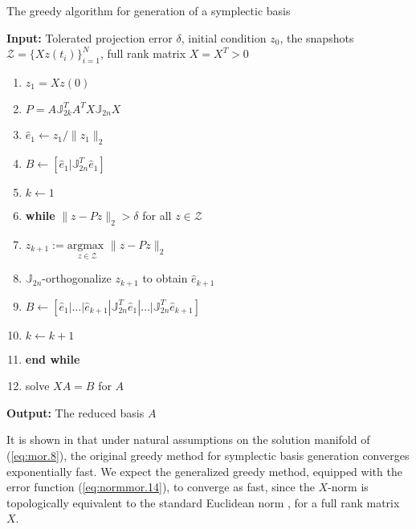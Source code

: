 \begin{algorithm} 
\caption{The greedy algorithm for generation of a symplectic basis} \label{alg:2}
{\bf Input:} Tolerated projection error $\delta$, initial condition $ z_0$, the snapshots $\mathcal Z = \{Xz(t_i)\}_{i=1}^{N}$, full rank matrix $X=X^T>0$
\begin{enumerate}
\item $z_1 = Xz(0)$
\item $P = A \mathbb J_{2k}^T A^T X \mathbb J_{2n} X$
\item $\hat e_1 \leftarrow z_1/ \| z_1 \|_2$
\item $B \leftarrow [\hat e_1| \mathbb J_{2n}^T \hat e_1]$
\item $k \leftarrow 1$
\item \textbf{while} $\| z - Pz\|_2 > \delta$ for all $z \in \mathcal Z$
\item \hspace{0.5cm} $z_{k+1} := \underset{z\in \mathcal Z}{\text{argmax }} \| z - Pz \|_2$
\item \hspace{0.5cm} $\mathbb J_{2n}$-orthogonalize $z_{k+1}$ to obtain $\hat e_{k+1}$
\item \hspace{0.5cm} $B \leftarrow [\hat e_1|\dots |\hat e_{k+1} | \mathbb J_{2n}^T \hat e_1|\dots| \mathbb J_{2n}^T  \hat e_{k+1}]$
\item \hspace{0.5cm} $k \leftarrow k+1$
\item \textbf{end while}
\item solve $X A = B$ for $A$
\end{enumerate}
\vspace{0.5cm}
{\bf Output:} The reduced basis $A$
\end{algorithm}

It is shown in \cite{doi:10.1137/17M1111991} that under natural assumptions on the solution manifold of (\ref{eq:mor.8}), the original greedy method for symplectic basis generation converges exponentially fast. We expect the generalized greedy method, equipped with the error function (\ref{eq:normmor.14}), to converge as fast, since the $X$-norm is topologically equivalent to the standard Euclidean norm \cite{friedman1970foundations}, for a full rank matrix $X$.

